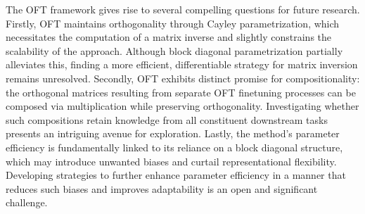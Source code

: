 The OFT framework gives rise to several compelling questions for future research. Firstly, OFT maintains orthogonality through Cayley parametrization, which necessitates the computation of a matrix inverse and slightly constrains the scalability of the approach. Although block diagonal parametrization partially alleviates this, finding a more efficient, differentiable strategy for matrix inversion remains unresolved. Secondly, OFT exhibits distinct promise for compositionality: the orthogonal matrices resulting from separate OFT finetuning processes can be composed via multiplication while preserving orthogonality. Investigating whether such compositions retain knowledge from all constituent downstream tasks presents an intriguing avenue for exploration. Lastly, the method’s parameter efficiency is fundamentally linked to its reliance on a block diagonal structure, which may introduce unwanted biases and curtail representational flexibility. Developing strategies to further enhance parameter efficiency in a manner that reduces such biases and improves adaptability is an open and significant challenge.

